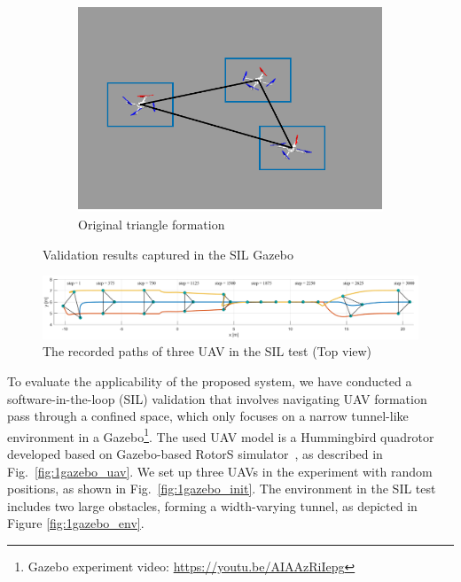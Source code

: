 \begin{figure}
\begin{subfigure}[b]{0.48\textwidth}
    \includegraphics[width=\textwidth]{paper2/images/gazebo_res6.pdf}
    \caption{Original triangle formation}
    \label{fig:1gazebo_6}
    \end{subfigure}
    \caption{Validation results captured in the SIL Gazebo}
    \label{fig:1gazebo_result}
\end{figure}

\begin{figure}
    \centering
    \includegraphics[width=\textwidth]{paper2/images/gazebo_path.pdf}
    \caption{The recorded paths of three UAV in the SIL test (Top view)}
    \label{fig:1gazebo_path}
\end{figure}

To evaluate the applicability of the proposed system, we have conducted a software-in-the-loop (SIL) validation that involves navigating UAV formation pass through a confined space, which only focuses on a narrow tunnel-like environment in a Gazebo\footnote{Gazebo experiment video: {\selectfont
\url{https://youtu.be/AIAAzRiIepg}}}. The used UAV model is a Hummingbird quadrotor developed based on Gazebo-based RotorS simulator~\cite{Furrer2016}, as described in Fig.~\ref{fig:1gazebo_uav}. We set up three UAVs in the experiment with random positions, as shown in Fig.~\ref{fig:1gazebo_init}. The environment in the SIL test includes two large obstacles, forming a width-varying tunnel, as depicted in Figure \ref{fig:1gazebo_env}.

